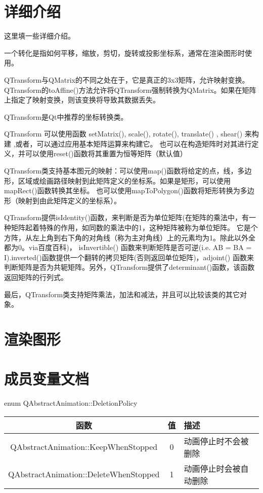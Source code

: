 
\section{详细介绍}

这里填一些详细介绍。

一个转化是指如何平移，缩放，剪切，旋转或投影坐标系，通常在渲染图形时使用。

QTransform与QMatrix的不同之处在于，它是真正的3x3矩阵，允许映射变换。QTransform的toAffine()方法允许将QTransform强制转换为QMatrix。如果在矩阵上指定了映射变换，则该变换将导致其数据丢失。

QTransform是Qt中推荐的坐标转换类。

QTransform 可以使用函数 setMatrix(), scale(), rotate(), translate() , shear() 来构建 ,或者，可以通过应用基本矩阵运算来构建它。
也可以在构造矩阵时对其进行定义，并可以使用reset()函数将其重置为恒等矩阵（默认值）

QTransform类支持基本图元的映射：可以使用map()函数将给定的点，线，多边形，区域或绘画路径映射到此矩阵定义的坐标系。如果是矩形，可以使用mapRect()函数转换其坐标。
也可以使用mapToPolygon()函数将矩形转换为多边形（映射到由此矩阵定义的坐标系）。

QTransform提供isIdentity()函数，来判断是否为单位矩阵(在矩阵的乘法中，有一种矩阵起着特殊的作用，如同数的乘法中的1，这种矩阵被称为单位矩阵。
它是个方阵，从左上角到右下角的对角线（称为主对角线）上的元素均为1。除此以外全都为0。via百度百科)， isInvertible() 函数来判断矩阵是否可逆(i.e. AB = BA = I).inverted()函数提供一个翻转的拷贝矩阵(否则返回单位矩阵)，adjoint() 函数来判断矩阵是否为共轭矩阵。另外，QTransform提供了determinant()函数，该函数返回矩阵的行列式。

最后，QTransform类支持矩阵乘法，加法和减法，并且可以比较该类的其它对象。

\section{渲染图形}

\section{成员变量文档}

enum QAbstractAnimation::DeletionPolicy


\begin{tabular}{|c|c|l|}
\hline
函数 	&值 &	描述 \\ 
\hline
QAbstractAnimation::KeepWhenStopped &	0 &	动画停止时不会被删除 \\
\hline 
QAbstractAnimation::DeleteWhenStopped &	1 & 	动画停止时会被自动删除 \\ 
\hline
\end{tabular}

